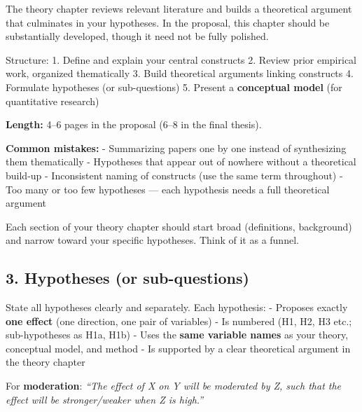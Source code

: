 \documentclass[
  11pt,
  a4paper,
]{scrbook}
\begin{document}
The theory chapter reviews relevant literature and builds a theoretical
argument that culminates in your hypotheses. In the proposal, this
chapter should be substantially developed, though it need not be fully
polished.

Structure: 1. Define and explain your central constructs 2. Review prior
empirical work, organized thematically 3. Build theoretical arguments
linking constructs 4. Formulate hypotheses (or sub-questions) 5. Present
a \textbf{conceptual model} (for quantitative research)

\textbf{Length:} 4--6 pages in the proposal (6--8 in the final thesis).

\textbf{Common mistakes:} - Summarizing papers one by one instead of
synthesizing them thematically - Hypotheses that appear out of nowhere
without a theoretical build-up - Inconsistent naming of constructs (use
the same term throughout) - Too many or too few hypotheses --- each
hypothesis needs a full theoretical argument

\begin{tcolorbox}[enhanced jigsaw, bottomrule=.15mm, opacityback=0, toprule=.15mm, colframe=quarto-callout-tip-color-frame, left=2mm, rightrule=.15mm, title=\textcolor{quarto-callout-tip-color}{\faLightbulb}\hspace{0.5em}{The cone structure}, colbacktitle=quarto-callout-tip-color!10!white, bottomtitle=1mm, colback=white, breakable, toptitle=1mm, titlerule=0mm, leftrule=.75mm, arc=.35mm, opacitybacktitle=0.6, coltitle=black]

Each section of your theory chapter should start broad (definitions,
background) and narrow toward your specific hypotheses. Think of it as a
funnel.

\end{tcolorbox}

\subsection{3. Hypotheses (or
sub-questions)}\label{hypotheses-or-sub-questions-1}

State all hypotheses clearly and separately. Each hypothesis: - Proposes
exactly \textbf{one effect} (one direction, one pair of variables) - Is
numbered (H1, H2, H3 etc.; sub-hypotheses as H1a, H1b) - Uses the
\textbf{same variable names} as your theory, conceptual model, and
method - Is supported by a clear theoretical argument in the theory
chapter

For \textbf{moderation}: \emph{``The effect of X on Y will be moderated
by Z, such that the effect will be stronger/weaker when Z is high.''}
\end{document}
